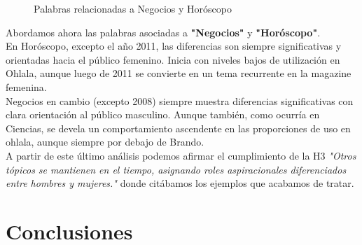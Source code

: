 \documentclass[a4paper]{article}
\begin{document}
\begin{figure}[H]
\centering
{}
\caption{Palabras relacionadas a Negocios y Hor\'oscopo} \label{fig:negoyhoro}
\end{figure}

Abordamos ahora las palabras asociadas a \textbf{"Negocios"} y \textbf{"Hor\'oscopo"}.\\
En Hor\'oscopo, excepto el a\~no 2011, las diferencias son siempre significativas y orientadas hacia el p\'ublico femenino. Inicia con niveles bajos de utilizaci\'on en Ohlala, aunque luego de 2011 se convierte en un tema recurrente en la magazine femenina.\\
Negocios en cambio (excepto 2008) siempre muestra diferencias significativas con clara orientaci\'on al p\'ublico masculino. Aunque tambi\'en, como ocurr\'ia en Ciencias, se devela un comportamiento ascendente en las proporciones de uso en ohlala, aunque siempre por debajo de Brando.\\
A partir de este \'ultimo an\'alisis podemos afirmar el cumplimiento de la H3 \textit{"Otros t\'opicos se mantienen en el tiempo, asignando roles aspiracionales diferenciados entre hombres y mujeres."} donde cit\'abamos los ejemplos que acabamos de tratar.


\section{Conclusiones}
\end{document}
